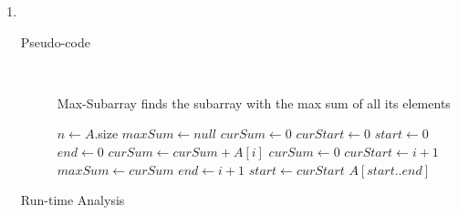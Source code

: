 \documentclass[paper=a4, fontsize=11pt]{scrartcl} %
\numberwithin{equation}{section} %
\numberwithin{figure}{section} %
\numberwithin{table}{section} %
\begin{document}
\begin{enumerate}[label=\bfseries Algorithm \arabic*:]
    \item \hfill \\
    \begin{description}
        \item[Pseudo-code] \hfill \\
        \begin{algorithmc}
            \caption{Max-Subarray finds the subarray with the max sum of all its elements}
                \State $n \gets A$.size
                \State $maxSum \gets null$
                \State $curSum \gets 0$
                \State $curStart \gets 0$
                \State $start \gets 0$
                \State $end \gets 0$
                    \State $curSum \gets curSum + A[i]$
                        \State $curSum \gets 0$
                        \State $curStart \gets i + 1$
                    \EndIf
                        \State $maxSum \gets curSum$
                        \State $end \gets i + 1$
                        \State $start \gets curStart$
                    \EndIf
                \EndFor
                \State \Return $A[start..end]$
            \EndFunction
        \end{algorithmc}
        \item[Run-time Analysis] \hfill \\
    \end{description}
\end{enumerate}
\end{document}

